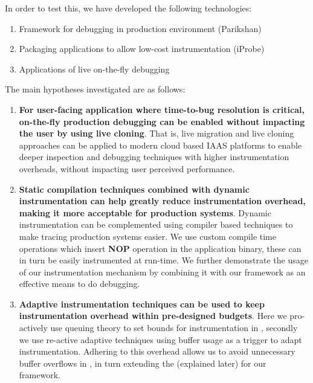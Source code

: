 In order to test this, we have developed the following technologies:
\begin{enumerate}
	\setlength{\itemsep}{0pt}
	\item Framework for debugging in production environment (Parikshan)
	\item Packaging applications to allow low-cost instrumentation (iProbe)
	\item Applications of live on-the-fly debugging
\end{enumerate}


\iffalse
The main hypotheses investigated are as follows:
\begin{enumerate}
	
	\item \textbf{For user-facing application where time-to-bug resolution is critical, on-the-fly production debugging can be enabled without impacting the user by using live cloning}.
	That is, live migration and live cloning approaches can be applied to modern cloud based IAAS platforms to enable deeper inspection and debugging techniques with higher instrumentation overheads, without impacting user perceived performance.
	
	\item \textbf{Static compilation techniques combined with dynamic instrumentation can help greatly reduce instrumentation overhead, making it more acceptable for production systems}.
	Dynamic instrumentation can be complemented using compiler based techniques to make tracing production systems easier.
	We use custom compile time operations which insert \textbf{NOP} operation in the application binary, these can in turn be easily instrumented at run-time. 
	We further demonstrate the usage of our instrumentation mechanism by combining it with our \livedebugging framework as an effective means to do debugging.
	
	\item \textbf{Adaptive instrumentation techniques can be used to keep instrumentation overhead within pre-designed budgets}. 
	Here we pro-actively use queuing theory to set bounds for instrumentation in \parikshan, secondly we use re-active adaptive techniques using buffer usage as a trigger to adapt instrumentation.
	Adhering to this overhead allows us to avoid unnecessary buffer overflows in \parikshan, in turn extending the \debugwindow(explained later) for our framework.
	
	
\end{enumerate}

